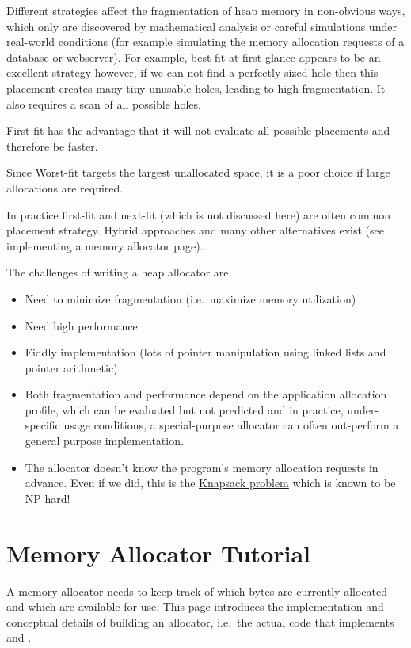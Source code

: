 Different strategies affect the fragmentation of heap memory in non-obvious ways, which only are discovered by mathematical analysis or careful simulations under real-world conditions (for example simulating the memory allocation requests of a database or webserver). For example, best-fit at first glance appears to be an excellent strategy however, if we can not find a perfectly-sized hole then this placement creates many tiny unusable holes, leading to high fragmentation. It also requires a scan of all possible holes.

First fit has the advantage that it will not evaluate all possible placements and therefore be faster.

Since Worst-fit targets the largest unallocated space, it is a poor choice if large allocations are required.

In practice first-fit and next-fit (which is not discussed here) are often common placement strategy. Hybrid approaches and many other alternatives exist (see implementing a memory allocator page).

The challenges of writing a heap allocator are 
\begin{itemize}
\item Need to minimize fragmentation (i.e.~maximize memory utilization) 
\item Need high performance 
\item Fiddly implementation (lots of pointer manipulation using linked lists and pointer arithmetic)
\item Both fragmentation and performance depend on the application allocation profile, which can be evaluated but not predicted and in practice, under-specific usage conditions, a special-purpose allocator can often out-perform a general purpose implementation. 
\item The allocator doesn't know the program's memory allocation requests in advance. Even if we did, this is the \href{http://en.wikipedia.org/wiki/Knapsack_problem}{Knapsack problem} which is known to be NP hard!
\end{itemize}


\section{Memory Allocator Tutorial}

A memory allocator needs to keep track of which bytes are currently allocated and which are available for use. This page introduces the implementation and conceptual details of building an allocator, i.e.~the actual code that implements  and .

